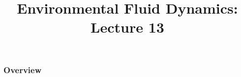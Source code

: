
\title{Environmental Fluid Dynamics: Lecture 13}
\newcommand{\ihat}{\boldsymbol{\hat{\imath}}}
\newcommand{\jhat}{\boldsymbol{\hat{\jmath}}}
\newcommand{\khat}{\boldsymbol{\hat{k}}}
\newcommand{\fontsizeone}{1.9em}
\usepackage{esvect}
\newcommand{\framecard}[2][colorgreen]{
  {\setbeamercolor{background canvas}{bg=#1}
    \begin{frame}[plain]
    \vfill
    \begin{center}
     {#2}
    \end{center}
    \vfill
    \end{frame}
  }
}



\begin{frame} 
  \titlepage
\end{frame}


\begin{frame}
\frametitle{Overview}
\tableofcontents
\end{frame}

